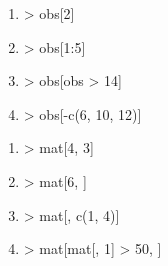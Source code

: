 \begin{reponse}{2.2}
    \begin{enumerate}
\item
\begin{Schunk}
\begin{Sinput}
> obs[2]
\end{Sinput}
\end{Schunk}
\item
\begin{Schunk}
\begin{Sinput}
> obs[1:5]
\end{Sinput}
\end{Schunk}
\item
\begin{Schunk}
\begin{Sinput}
> obs[obs > 14]
\end{Sinput}
\end{Schunk}
\item
\begin{Schunk}
\begin{Sinput}
> obs[-c(6, 10, 12)]
\end{Sinput}
\end{Schunk}
    \end{enumerate}
  
\end{reponse}
\begin{reponse}{2.3}
    \begin{enumerate}
\item
\begin{Schunk}
\begin{Sinput}
> mat[4, 3]
\end{Sinput}
\end{Schunk}
\item
\begin{Schunk}
\begin{Sinput}
> mat[6, ]
\end{Sinput}
\end{Schunk}
\item
\begin{Schunk}
\begin{Sinput}
> mat[, c(1, 4)]
\end{Sinput}
\end{Schunk}
\item
\begin{Schunk}
\begin{Sinput}
> mat[mat[, 1] > 50, ]
\end{Sinput}
\end{Schunk}
    \end{enumerate}
  
\end{reponse}
